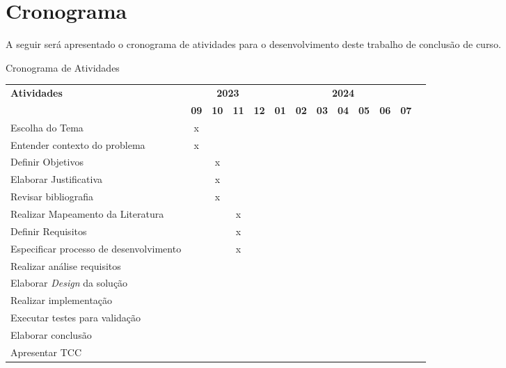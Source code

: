 

% 

% 







\textual









\chapter{Cronograma}
A seguir será apresentado o cronograma de atividades para o desenvolvimento deste trabalho de conclusão de curso.
\begin{quadro}[H]
    \centering
    \caption{Cronograma de Atividades}
    \begin{tabular}{|p{3.5cm}|c|c|c|c|c|c|c|c|c|c|c|c|}
        \hline
        \multirow{2}{*}{\textbf{Atividades}} & \multicolumn{4}{c|}{\textbf{2023}} & \multicolumn{7}{c|}{\textbf{2024}} \\ \cline{2-12}
        & \textbf{09} & \textbf{10} & \textbf{11} & \textbf{12} & \textbf{01} & \textbf{02} & \textbf{03} & \textbf{04} & \textbf{05} & \textbf{06} & \textbf{07} \\ \hline
        Escolha do Tema & x & & & & & & & & & & \\ \hline
        Entender contexto do problema & x & & & & & & & & & & \\ \hline
        Definir Objetivos & & x & & & & & & & & & \\ \hline
        Elaborar Justificativa & & x & & & & & & & & & \\ \hline
        Revisar bibliografia & & x & & & & & & & & & \\ \hline
        Realizar Mapeamento da Literatura & & & x & & & & & & & & \\ \hline
        Definir Requisitos & & & x & & & & & & & & \\ \hline
        Especificar processo de desenvolvimento & & & x & & & & & & & & \\ \hline
        Realizar análise requisitos & & & & & & & & & & & \\ \hline
        Elaborar \textit{Design} da solução & & & & & & & & & & & \\ \hline
        Realizar implementação & & & & & & & & & & & \\ \hline
        Executar testes para validação & & & & & & & & & & & \\ \hline
        Elaborar conclusão & & & & & & & & & & & \\ \hline
        Apresentar TCC & & & & & & & & & & & \\ \hline
      \end{tabular}
    \label{quad:cronograma}
\end{quadro}
% 

